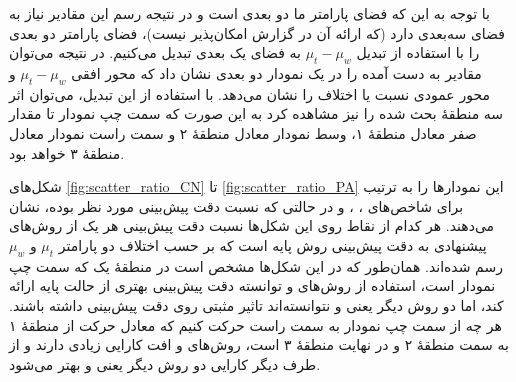 با توجه به این که فضای پارامتر ما دو بعدی است و در نتیجه رسم این مقادیر نیاز به فضای سه‌بعدی دارد (که ارائه آن در گزارش امکان‌پذیر نیست)، فضای پارامتر دو بعدی را با استفاده از تبدیل $\mu_t - \mu_w$ به فضای یک بعدی تبدیل می‌کنیم. در نتیجه می‌توان مقادیر به دست آمده را در یک نمودار دو بعدی نشان داد که محور افقی $\mu_t - \mu_w$ و محور عمودی نسبت یا اختلاف را نشان می‌دهد. با استفاده از این تبدیل، می‌توان اثر سه منطقهٔ بحث شده را نیز مشاهده کرد به این صورت که سمت چپ نمودار تا مقدار صفر معادل منطقهٔ ۱، وسط نمودار معادل منطقهٔ ۲ و سمت راست نمودار معادل منطقهٔ ۳ خواهد بود.

شکل‌های \ref{fig:scatter_ratio_CN} تا \ref{fig:scatter_ratio_PA} این نمودارها را به ترتیب برای شاخص‌های
، ،  و 
در حالتی که نسبت دقت پیش‌بینی مورد نظر بوده، نشان می‌دهند. هر کدام از نقاط روی این شکل‌ها نسبت دقت پیش‌بینی هر یک از روش‌های پیشنهادی به دقت پیش‌بینی روش پایه است که بر حسب اختلاف دو پارامتر $\mu_t$ و $\mu_w$ رسم شده‌اند. همان‌طور که در این شکل‌ها مشخص است در منطقهٔ یک که سمت چپ نمودار است، استفاده از روش‌های  و  توانسته دقت پیش‌بینی بهتری از حالت پایه ارائه کند، اما دو روش دیگر یعنی  و  نتوانسته‌اند تاثیر مثبتی روی دقت پیش‌بینی داشته باشند. هر چه از سمت چپ نمودار به سمت راست حرکت کنیم که معادل حرکت از منطقهٔ ۱ به سمت منطقهٔ ۲ و در نهایت منطقهٔ ۳ است، روش‌های  و  افت کارایی زیادی دارند و از طرف دیگر کارایی دو روش دیگر یعنی  و  بهتر می‌شود.

